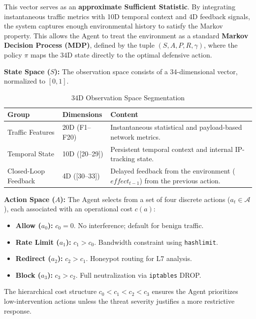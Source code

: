 \documentclass[12pt,a4paper]{report}
\begin{document}
This vector serves as an \textbf{approximate Sufficient Statistic}. By integrating instantaneous traffic metrics with 10D temporal context and 4D feedback signals, the system captures enough environmental history to satisfy the Markov property. This allows the Agent to treat the environment as a standard \textbf{Markov Decision Process (MDP)}, defined by the tuple $(S, A, P, R, \gamma)$, where the policy $\pi$ maps the 34D state directly to the optimal defensive action.

\textbf{State Space ($S$):} The observation space consists of a 34-dimensional vector, normalized to $[0, 1]$.

\begin{table}[htbp]
\centering
\caption{34D Observation Space Segmentation}
\label{tab:obs_segmentation}
\begin{tabular}{L{3.5cm} C{2.5cm} L{8cm}}
\toprule
\textbf{Group} & \textbf{Dimensions} & \textbf{Content} \\
\midrule
Traffic Features & 20D (F1–F20) & Instantaneous statistical and payload-based network metrics. \\
Temporal State & 10D ([20–29]) & Persistent temporal context and internal IP-tracking state. \\
Closed-Loop Feedback & 4D ([30–33]) & Delayed feedback from the environment ($effect_{t-1}$) from the previous action. \\
\bottomrule
\end{tabular}
\end{table}

\textbf{Action Space ($A$):} The Agent selects from a set of four discrete actions ($a_t \in \mathcal{A}$), each associated with an operational cost $c(a)$:
\begin{itemize}
    \item \textbf{Allow ($a_0$):} $c_0 = 0$. No interference; default for benign traffic.
    \item \textbf{Rate Limit ($a_1$):} $c_1 > c_0$. Bandwidth constraint using \texttt{hashlimit}.
    \item \textbf{Redirect ($a_2$):} $c_2 > c_1$. Honeypot routing for L7 analysis.
    \item \textbf{Block ($a_3$):} $c_3 > c_2$. Full neutralization via \texttt{iptables} DROP.
\end{itemize}

The hierarchical cost structure $c_0 < c_1 < c_2 < c_3$ ensures the Agent prioritizes low-intervention actions unless the threat severity justifies a more restrictive response.
\end{document}
